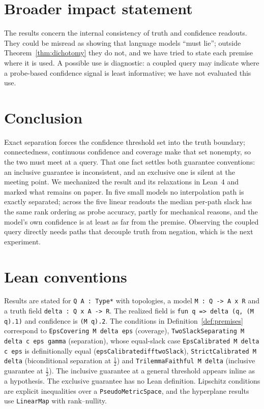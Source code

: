 \documentclass[10pt]{article}
\theoremstyle{definition}
\theoremstyle{remark}
\newcommand{\leanid}[1]{{\def\_{\textunderscore\allowbreak}\texttt{#1}}}
\begin{document}
\section*{Broader impact statement}
The results concern the internal consistency of truth and confidence
readouts. They could be misread as showing that language models
``must lie''; outside Theorem~\ref{thm:dichotomy} they do not, and we have
tried to state each premise where it is used. A possible use is
diagnostic: a coupled query may indicate where a probe-based confidence
signal is least informative; we have not evaluated this use.

\section{Conclusion}
\label{sec:conclusion}

Exact separation forces the confidence threshold set into the truth
boundary; connectedness, continuous confidence and coverage make that set
nonempty, so the two must meet at a query. That one fact settles both guarantee conventions: an inclusive
guarantee is inconsistent, and an exclusive one is silent at the meeting
point. We mechanized the result and its relaxations in Lean~4 and marked
what remains on paper. In five small models no interpolation path is exactly separated; across
the five linear readouts the median per-path slack has the same rank
ordering as probe accuracy, partly for mechanical reasons, and the model's
own confidence is at least as far from the premise. Observing the coupled query directly needs paths
that decouple truth from negation, which is the next experiment.




\appendix

\section{Lean conventions}
\label{app:conventions}

Results are stated for \texttt{Q A : Type*} with topologies, a model
\texttt{M : Q -> A x R} and a truth field \texttt{delta : Q x A -> R}. The
realized field is \texttt{fun q => delta (q, (M q).1)} and confidence is
\texttt{(M q).2}. The conditions in Definition~\ref{def:premises}
correspond to \leanid{EpsCovering M delta eps} (coverage),
\leanid{TwoSlackSeparating M delta c eps gamma} (separation), whose equal-slack case
\leanid{EpsCalibrated M delta c eps} is definitionally equal
(\leanid{epsCalibrated\_iff\_twoSlack}), \leanid{StrictCalibrated M delta}
(biconditional separation at $\tfrac12$) and \leanid{TrilemmaFaithful M delta}
(inclusive guarantee at $\tfrac12$). The inclusive guarantee at a general
threshold appears inline as a hypothesis. The exclusive guarantee has no
Lean definition. Lipschitz conditions are explicit inequalities over a
\texttt{PseudoMetricSpace}, and the hyperplane results use
\texttt{LinearMap} with rank--nullity.
\end{document}
